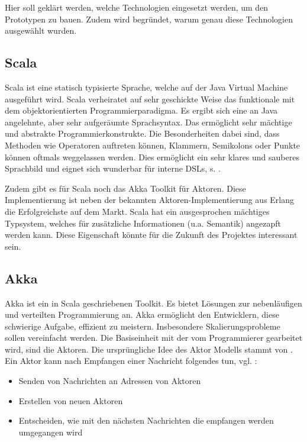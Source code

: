 Hier soll geklärt werden, welche Technologien eingesetzt werden, um den Prototypen zu bauen. Zudem wird begründet, warum genau diese Technologien ausgewählt wurden.

 
\subsection{Scala}\label{}
 
Scala ist eine statisch typisierte Sprache, welche auf der Java Virtual Machine ausgeführt wird. Scala verheiratet auf sehr geschickte Weise das funktionale mit dem objektorientierten Programmierparadigma. Es ergibt sich eine an Java angelehnte, aber sehr aufgeräumte Sprachsyntax. Das ermöglicht sehr mächtige und abstrakte Programmierkonstrukte. Die Besonderheiten dabei sind, dass Methoden wie Operatoren auftreten können, Klammern, Semikolons oder Punkte können oftmals weggelassen werden. Dies ermöglicht ein sehr klares und sauberes Sprachbild und eignet sich wunderbar für interne DSLs, s. \citep{Hodapp}.

 
Zudem gibt es für Scala noch das Akka Toolkit für Aktoren. Diese Implementierung ist neben der bekannten Aktoren-Implementierung aus Erlang die Erfolgreichste auf dem Markt. Scala hat ein ausgesprochen mächtiges Typsystem, welches für zusätzliche Informationen (u.a. Semantik) angezapft werden kann. Diese Eigenschaft könnte für die Zukunft des Projektes interessant sein.

 
\subsection{Akka}\label{}
 
Akka ist ein in Scala geschriebenen Toolkit. Es bietet Lösungen zur nebenläufigen und verteilten Programmierung an. Akka ermöglicht den Entwicklern, diese schwierige Aufgabe, effizient zu meistern. Insbesondere Skalierungsprobleme sollen vereinfacht werden. Die Basiseinheit mit der vom Programmierer gearbeitet wird, sind die Aktoren. Die ursprüngliche Idee des Aktor Modells stammt von \citep{Hewitt}. Ein Aktor kann nach Empfangen einer Nachricht folgendes tun, vgl. \citep{Hewitt2}:

 
\begin{itemize}

\item Senden von Nachrichten an Adressen von Aktoren
\item Erstellen von neuen Aktoren
\item Entscheiden, wie mit den nächsten Nachrichten die empfangen werden umgegangen wird
\end{itemize}
 
